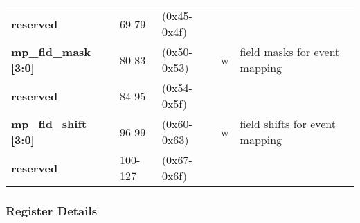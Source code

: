 \documentclass[11pt,a4paper,twoside]{article}
\begin{document}
\begin{center}
\begin{tabularx}{\textwidth}{| p{34mm} p{13mm} p{21mm} p{7mm} X |}
		\cellcolor{gray!25}\textbf{reserved} & \cellcolor{gray!25}69-79   & \cellcolor{gray!25}(0x45-0x4f) & \cellcolor{gray!25} & \cellcolor{gray!25}\\%
		\textbf{mp\_fld\_mask [3:0]}         & 80-83                      & (0x50-0x53)                    & w                   & field masks for event mapping \\%
		\cellcolor{gray!25}\textbf{reserved} & \cellcolor{gray!25}84-95   & \cellcolor{gray!25}(0x54-0x5f) & \cellcolor{gray!25} & \cellcolor{gray!25}\\%
		\textbf{mp\_fld\_shift [3:0]}        & 96-99                      & (0x60-0x63)                    & w                   & field shifts for event mapping  \\%
		\cellcolor{gray!25}\textbf{reserved} & \cellcolor{gray!25}100-127 & \cellcolor{gray!25}(0x67-0x6f) & \cellcolor{gray!25} & \cellcolor{gray!25}\\%
		\hline
	\end{tabularx}
\end{center}


\subsubsection*{Register Details}
\end{document}
